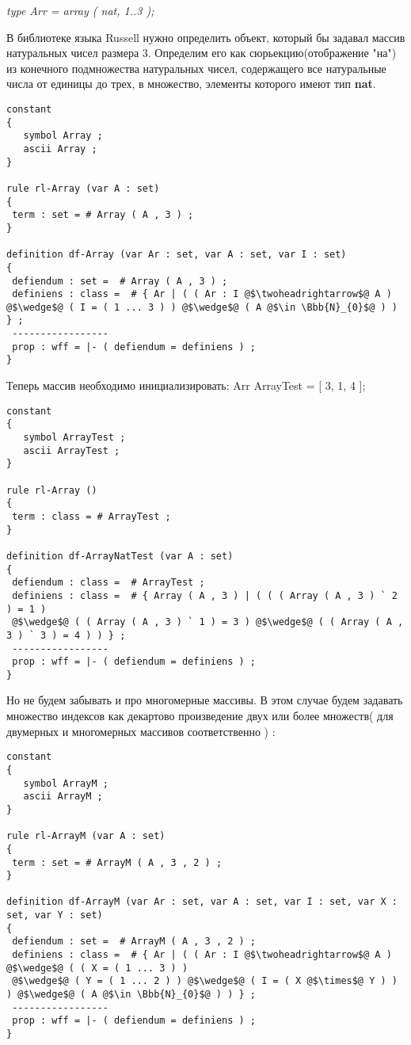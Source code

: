 \documentclass[10pt,a4paper]{article}
\begin{document}
\begin{center}
\textit{type Arr = array ( nat, 1..3 );}
\end{center}

В библиотеке языка Russell нужно определить объект, который бы задавал массив натуральных чисел размера 3. Определим его как сюрьекцию(отображение "на") из конечного подмножества натуральных чисел, содержащего все натуральные числа от единицы до трех, в множество, элементы которого имеют тип \textbf{nat}.
\begin{lstlisting}
constant
{
   symbol Array ;
   ascii Array ;
}

rule rl-Array (var A : set)
{
 term : set = # Array ( A , 3 ) ;
}

definition df-Array (var Ar : set, var A : set, var I : set)
{
 defiendum : set =  # Array ( A , 3 ) ;
 definiens : class =  # { Ar | ( ( Ar : I @$\twoheadrightarrow$@ A ) @$\wedge$@ ( I = ( 1 ... 3 ) ) @$\wedge$@ ( A @$\in \Bbb{N}_{0}$@ ) ) } ;
 -----------------
 prop : wff = |- ( defiendum = definiens ) ;
}
\end{lstlisting}
Теперь массив необходимо инициализировать:
    Arr ArrayTest = [ 3, 1, 4 ];
\begin{lstlisting}
constant
{
   symbol ArrayTest ;
   ascii ArrayTest ;
}

rule rl-Array ()
{
 term : class = # ArrayTest ;
}

definition df-ArrayNatTest (var A : set)
{
 defiendum : class =  # ArrayTest ;
 definiens : class =  # { Array ( A , 3 ) | ( ( ( Array ( A , 3 ) ` 2 ) = 1 )
 @$\wedge$@ ( ( Array ( A , 3 ) ` 1 ) = 3 ) @$\wedge$@ ( ( Array ( A , 3 ) ` 3 ) = 4 ) ) } ;
 -----------------
 prop : wff = |- ( defiendum = definiens ) ;
}
\end{lstlisting}
Но не будем забывать и про многомерные массивы. В этом случае будем задавать множество индексов как декартово произведение двух или более множеств( для двумерных и многомерных массивов соответственно ) :
\begin{lstlisting}
constant
{
   symbol ArrayM ;
   ascii ArrayM ;
}

rule rl-ArrayM (var A : set)
{
 term : set = # ArrayM ( A , 3 , 2 ) ;
}

definition df-ArrayM (var Ar : set, var A : set, var I : set, var X : set, var Y : set)
{
 defiendum : set =  # ArrayM ( A , 3 , 2 ) ;
 definiens : class =  # { Ar | ( ( Ar : I @$\twoheadrightarrow$@ A ) @$\wedge$@ ( ( X = ( 1 ... 3 ) )
 @$\wedge$@ ( Y = ( 1 ... 2 ) ) @$\wedge$@ ( I = ( X @$\times$@ Y ) ) ) @$\wedge$@ ( A @$\in \Bbb{N}_{0}$@ ) ) } ;
 -----------------
 prop : wff = |- ( defiendum = definiens ) ;
}
\end{lstlisting}
\end{document}

